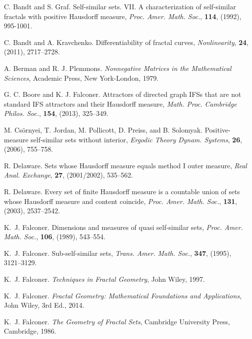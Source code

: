 \documentclass[11pt,english,british]{article}
\numberwithin{equation}{section}
\begin{document}
\begin{thebibliography}{99}

C. Bandt and S. Graf.
Self-similar sets. VII. A characterization of self-similar fractals with positive Hausdorff measure,
\emph{ Proc. Amer. Math. Soc.}, {\bf 114}, (1992), 995-1001.

C. Bandt and A. Kravchenko.
Differentiability of fractal curves,
\emph{ Nonlinearity}, {\bf 24}, (2011), 2717--2728.

A. Berman and R. J. Plemmons.
 {\em Nonnegative Matrices in the Mathematical Sciences},
Academic Press, New York-London, 1979.



G. C. Boore and K. J. Falconer.
Attractors of directed graph IFSs that are not standard IFS attractors and their Hausdorff measure,
\emph{Math. Proc. Cambridge Philos. Soc.}, {\bf 154}, (2013), 325--349. 



M. Cs\"ornyei, T. Jordan, M. Pollicott, D. Preiss, and B. Solomyak.
Positive-measure self-similar sets without interior,
\emph{Ergodic Theory Dynam. Systems}, {\bf  26}, (2006), 755--758. 


R.  Delaware.
Sets whose Hausdorff measure equals method I outer measure,
\emph{Real Anal. Exchange}, {\bf 27}, (2001/2002), 535--562. 



R.  Delaware.
Every set of finite Hausdorff measure is a countable union of sets whose Hausdorff measure and content coincide,
\emph{Proc. Amer. Math. Soc.}, {\bf 131}, (2003), 2537--2542. 




K.~J. Falconer.
Dimensions and measures of quasi self-similar sets,
\emph{Proc. Amer. Math. Soc.}, {\bf 106}, (1989), 543--554.

K.~J. Falconer.
Sub-self-similar sets,
\emph{Trans. Amer. Math. Soc.}, {\bf 347}, (1995), 3121--3129.



K.~J. Falconer.
 {\em Techniques in Fractal Geometry},
John Wiley, 1997.


K.~J. Falconer.
{\em Fractal Geometry: Mathematical Foundations and Applications},
John Wiley, 3rd Ed., 2014.

K.~J. Falconer.
{\em The Geometry of Fractal Sets},
Cambridge University Press, Cambridge,
1986.



\end{thebibliography}
\end{document}
